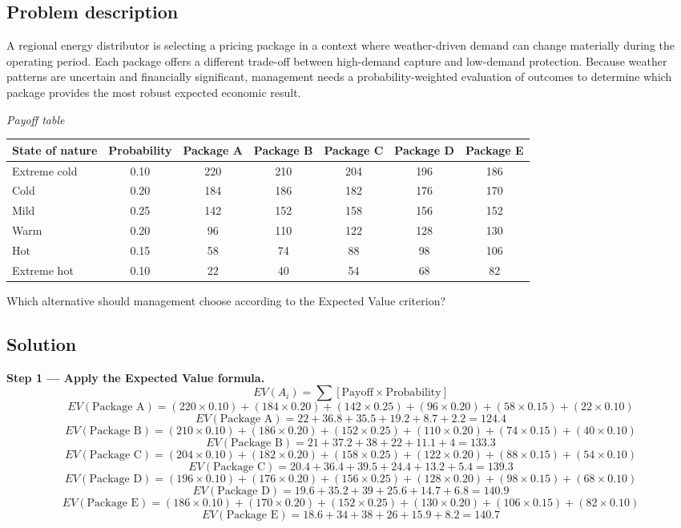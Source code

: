 \begin{ExamProblems}
		\subsection*{Problem description}
		A regional energy distributor is selecting a pricing package in a context where weather-driven demand can change materially during the operating period. Each package offers a different trade-off between high-demand capture and low-demand protection. Because weather patterns are uncertain and financially significant, management needs a probability-weighted evaluation of outcomes to determine which package provides the most robust expected economic result.

		\begin{center}
			\textit{Payoff table}
			\begin{tabular}{l c c c c c c}
				\toprule
				State of nature & Probability & Package A & Package B & Package C & Package D & Package E \\
				\midrule
				Extreme cold & 0.10 & 220 & 210 & 204 & 196 & 186 \\
				Cold & 0.20 & 184 & 186 & 182 & 176 & 170 \\
				Mild & 0.25 & 142 & 152 & 158 & 156 & 152 \\
				Warm & 0.20 & 96 & 110 & 122 & 128 & 130 \\
				Hot & 0.15 & 58 & 74 & 88 & 98 & 106 \\
				Extreme hot & 0.10 & 22 & 40 & 54 & 68 & 82 \\
				\bottomrule
			\end{tabular}
		\end{center}

		Which alternative should management choose according to the Expected Value criterion?

		\subsection*{Solution}
		\textbf{Step 1 --- Apply the Expected Value formula.}
		\[
		EV(A_i)=\sum [\text{Payoff}\times\text{Probability}]
		\]
		\[
		EV(\text{Package A})=(220\times0.10)+(184\times0.20)+(142\times0.25)+(96\times0.20)+(58\times0.15)+(22\times0.10)
		\]
		\[
		EV(\text{Package A})=22+36.8+35.5+19.2+8.7+2.2=124.4
		\]
		\[
		EV(\text{Package B})=(210\times0.10)+(186\times0.20)+(152\times0.25)+(110\times0.20)+(74\times0.15)+(40\times0.10)
		\]
		\[
		EV(\text{Package B})=21+37.2+38+22+11.1+4=133.3
		\]
		\[
		EV(\text{Package C})=(204\times0.10)+(182\times0.20)+(158\times0.25)+(122\times0.20)+(88\times0.15)+(54\times0.10)
		\]
		\[
		EV(\text{Package C})=20.4+36.4+39.5+24.4+13.2+5.4=139.3
		\]
		\[
		EV(\text{Package D})=(196\times0.10)+(176\times0.20)+(156\times0.25)+(128\times0.20)+(98\times0.15)+(68\times0.10)
		\]
		\[
		EV(\text{Package D})=19.6+35.2+39+25.6+14.7+6.8=140.9
		\]
		\[
		EV(\text{Package E})=(186\times0.10)+(170\times0.20)+(152\times0.25)+(130\times0.20)+(106\times0.15)+(82\times0.10)
		\]
		\[
		EV(\text{Package E})=18.6+34+38+26+15.9+8.2=140.7
		\]
		

\end{ExamProblems}
